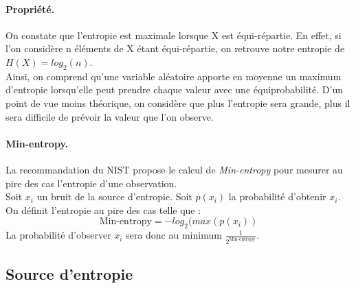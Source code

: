 \paragraph{Propriété.\\} 
On constate que l'entropie est maximale lorsque X est équi-répartie. En effet, si l'on considère n éléments de X étant équi-répartie, on retrouve notre entropie de $H(X) = log_2(n)$. \\


Ainsi, on comprend qu'une variable aléatoire apporte en moyenne un maximum d'entropie lorsqu'elle peut prendre chaque valeur avec une équiprobabilité. D'un point de vue moins théorique, on considère que plus l'entropie sera grande, plus il sera difficile de prévoir la valeur que l'on observe.

\paragraph{Min-entropy.\\}
La recommandation du NIST propose le calcul de \textit{Min-entropy} pour mesurer au pire des cas l'entropie d'une observation. \\

Soit $x_i$ un bruit de la source d'entropie. Soit $p(x_i)$ la probabilité d'obtenir $x_i$. On définit l'entropie au pire des cas telle que : 
$$\text{Min-entropy}=-log_2(max(p(x_i))$$
La probabilité d'observer $x_i$ sera donc au minimum $\frac{1}{2^\text{Min-entropy}}$.

\subsection{Source d'entropie}
